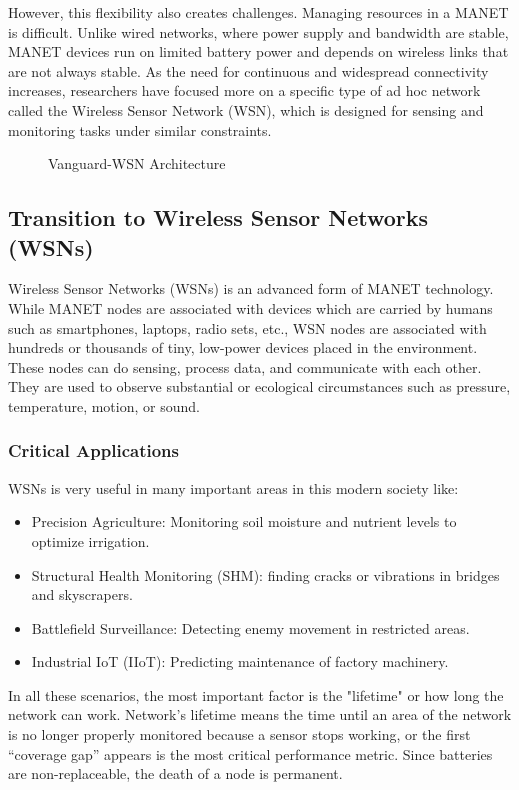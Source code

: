 \documentclass[conference]{IEEEtran}
\begin{document}
However, this flexibility also creates challenges. Managing resources in a MANET is difficult. Unlike wired networks, where power supply and bandwidth are stable, MANET devices run on limited battery power and depends on wireless links that are not always stable. As the need for continuous and widespread connectivity increases, researchers have focused more on a specific type of ad hoc network called the Wireless Sensor Network (WSN), which is designed for sensing and monitoring tasks under similar constraints.

\begin{figure}[htbp]
\centerline{}
\caption{Vanguard-WSN Architecture}
\label{fig1}
\end{figure}

\subsection{Transition to Wireless Sensor Networks (WSNs)}
Wireless Sensor Networks (WSNs) is an advanced form of MANET technology. While MANET nodes are associated with devices which are carried by humans such as smartphones, laptops, radio sets, etc., WSN nodes are associated with hundreds or thousands of tiny, low-power devices placed in the environment. These nodes can do sensing, process data, and communicate with each other. They are used to observe substantial or ecological circumstances such as pressure, temperature, motion, or sound.

\subsubsection{Critical Applications}
WSNs is very useful in many important areas in this modern society like:
\begin{itemize}
    \item Precision Agriculture: Monitoring soil moisture and nutrient levels to optimize irrigation.
    \item Structural Health Monitoring (SHM): finding cracks or vibrations in bridges and skyscrapers.
    \item Battlefield Surveillance: Detecting enemy movement in restricted areas.
    \item Industrial IoT (IIoT): Predicting maintenance of factory machinery.
\end{itemize}
In all these scenarios, the most important factor is the "lifetime" or how long the network can work. Network’s lifetime means the time until an area of the network is no longer properly monitored because a sensor stops working, or the first “coverage gap” appears is the most critical performance metric. Since batteries are non-replaceable, the death of a node is permanent.
\end{document}
